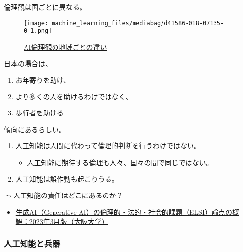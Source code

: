 \documentclass[
  xelatex,
  ja=standard]{bxjsarticle}
\providecommand{\tightlist}{%
  \setlength{\itemsep}{0pt}\setlength{\parskip}{0pt}}\usepackage{longtable,booktabs,array}
\begin{document}
倫理観は国ごとに異なる。

\begin{figure}[htpb]

{\centering \texttt{[image: machine\_learning\_files/mediabag/d41586-018-07135-0\_1.png]}

}

\caption{\href{https://www.nature.com/articles/d41586-018-07135-0}{AI倫理観の地域ごとの違い}}

\end{figure}

\href{https://www.technologyreview.com/2018/10/24/139313/a-global-ethics-study-aims-to-help-ai-solve-the-self-driving-trolley-problem/}{日本の場合は}、

\begin{enumerate}
\def\labelenumi{\arabic{enumi}.}
\tightlist
\item
  お年寄りを助け、
\item
  より多くの人を助けるわけではなく、
\item
  歩行者を助ける
\end{enumerate}

傾向にあるらしい。

\begin{enumerate}
\def\labelenumi{\arabic{enumi}.}
\tightlist
\item
  人工知能は人間に代わって倫理的判断を行うわけではない。

  \begin{itemize}
  \tightlist
  \item
    人工知能に期待する倫理も人々、国々の間で同じではない。
  \end{itemize}
\item
  人工知能は誤作動も起こりうる。
\end{enumerate}

\(\leadsto\)人工知能の責任はどこにあるのか？

\begin{itemize}
\tightlist
\item
  \href{https://elsi.osaka-u.ac.jp/research/2120}{生成AI（Generative
  AI）の倫理的・法的・社会的課題（ELSI）論点の概観：2023年3月版（大阪大学）}
\end{itemize}

\hypertarget{ux4ebaux5de5ux77e5ux80fdux3068ux5175ux5668}{%
\subsubsection{人工知能と兵器}\label{ux4ebaux5de5ux77e5ux80fdux3068ux5175ux5668}}
\end{document}
